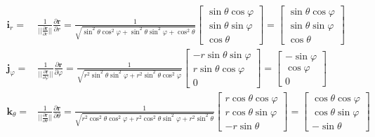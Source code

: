 \documentclass
[
a4paper,                      %
twoside,					  %
12pt,                         %
abstract,		      %
fleqn,                        %
]
{scrartcl} %
\begin{document}
\begin{description}
\begin{equation}
\begin{aligned}
\mathbf{i}_{r}=&\frac{1}{\lvert\lvert\frac{\partial \mathbf{r}}{\partial r}\rvert\rvert}\frac{\partial \mathbf{r}}{\partial r}=\frac{1}{\sqrt{\sin^{2}{\theta}\cos^{2}{\varphi}+\sin^{2}{\theta}\sin^{2}{\varphi}+\cos^{2}{\theta}}}\begin{bmatrix}
\sin{\theta}\cos{\varphi}\\[5pt]
\sin{\theta}\sin{\varphi}\\[5pt]
\cos{\theta}\end{bmatrix}=\begin{bmatrix}
\sin{\theta}\cos{\varphi}\\[5pt]
\sin{\theta}\sin{\varphi}\\[5pt]
\cos{\theta}\end{bmatrix}\\
\mathbf{j}_{\varphi}=&\frac{1}{\lvert\lvert\frac{\partial \mathbf{r}}{\partial\varphi}\rvert\rvert}\frac{\partial \mathbf{r}}{\partial\varphi}=\frac{1}{\sqrt{r^{2}\sin^{2}{\theta}\sin^{2}{\varphi}+r^{2}\sin^{2}{\theta}\cos^{2}{\varphi}}}\begin{bmatrix}
-r\sin{\theta}\sin{\varphi}\\[5pt]
r\sin{\theta}\cos{\varphi}\\[5pt]
0\end{bmatrix}=\begin{bmatrix}
-\sin{\varphi}\\[5pt]
\cos{\varphi}\\[5pt]
0\end{bmatrix}\\
\mathbf{k}_{\theta}=&\frac{1}{\lvert\lvert\frac{\partial \mathbf{r}}{\partial\theta}\rvert\rvert}\frac{\partial \mathbf{r}}{\partial\theta}=\frac{1}{\sqrt{r^{2}\cos^{2}{\theta}\cos^{2}{\varphi}+r^{2}\cos^{2}{\theta}\sin^{2}{\varphi}+r^{2}\sin^{2}{\theta}}}\begin{bmatrix}
r\cos{\theta}\cos{\varphi}\\[5pt]
r\cos{\theta}\sin{\varphi}\\[5pt]
-r\sin{\theta}\end{bmatrix}=\begin{bmatrix}
\cos{\theta}\cos{\varphi}\\[5pt]
\cos{\theta}\sin{\varphi}\\[5pt]
-\sin{\theta}\end{bmatrix}\\
\end{aligned}
\end{equation}


\end{description}
\end{document}
